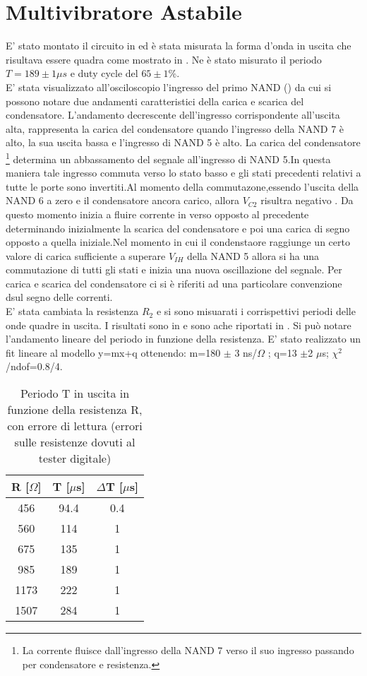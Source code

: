 \section{Multivibratore Astabile}
E' stato montato il circuito in  ed è stata misurata la forma d'onda in uscita che risultava essere quadra come mostrato in . Ne è stato misurato il periodo $T= 189 \pm 1 \mu s$ e duty cycle del  $65 \pm 1$\%. \\
E' stata visualizzato all'osciloscopio l'ingresso del primo NAND () da cui si possono notare due andamenti caratteristici della carica e scarica del condensatore. L'andamento decrescente dell'ingresso corrispondente all'uscita alta, rappresenta la carica del condensatore quando l'ingresso della NAND 7 è alto, la sua uscita bassa e l'ingresso di NAND 5 è alto. La carica del condensatore \footnote{La corrente fluisce dall'ingresso della NAND 7 verso il suo ingresso passando per condensatore e resistenza. } determina un abbassamento del segnale all'ingresso di NAND 5.In questa maniera tale ingresso commuta verso lo stato basso e gli stati precedenti relativi a tutte le porte sono invertiti.Al momento della commutazone,essendo l'uscita della NAND 6 a zero e il condensatore ancora carico, allora $V_{C2}$ risultra negativo . Da questo momento inizia a fluire corrente in verso opposto al precedente determinando inizialmente la scarica del condensatore e poi una carica di segno opposto a quella iniziale.Nel momento in cui il condenstaore raggiunge un certo valore di carica sufficiente a superare $V_{IH}$ della NAND 5 allora si ha una commutazione di tutti gli stati e inizia una nuova oscillazione del segnale. Per carica e scarica del condensatore ci si è riferiti ad una particolare convenzione dsul segno delle correnti.\\
E' stata cambiata la resistenza $R_2$ e si sono misuarati i corrispettivi periodi delle onde quadre in uscita. I risultati sono in \tab{} e sono ache riportati in . Si può notare l'andamento lineare del periodo in funzione della resistenza. E' stato realizzato un fit lineare al modello y=mx+q ottenendo: m=180 $\pm$ 3 ns/$\Omega$ ; q=13 $\pm$2 $\mu$s; $\chi^{2}$/ndof=0.8/4.\\
\begin{table}[h]
	\centering
	\begin{tabular}{ccc}
		{R [$\Omega$]} & {T [$\mu $s]} & {$\Delta$T [$\mu $s]} \\
		\midrule
           456 & 94.4 & 0.4\\
           560 & 114 & 1\\
           675 & 135 & 1\\
           985 & 189 & 1\\
           1173 & 222 & 1\\
           1507 & 284 & 1\\
 	\end{tabular}
	\caption{ Periodo T in uscita in funzione della resistenza R, con errore di lettura (errori sulle resistenze dovuti al tester digitale)}
	\label{t:periodo}
\end{table}
